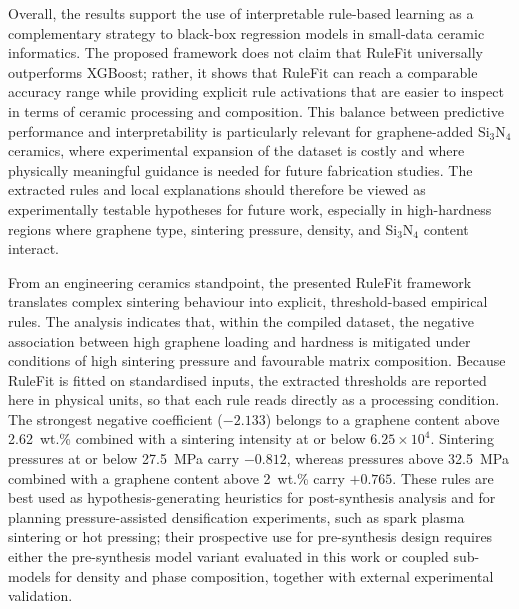 \documentclass[pdflatex,sn-mathphys-num]{sn-jnl}%
\newif\ifrevmarks%
\newcommand{\revmark}[1]{\ifrevmarks\textcolor{revblue}{#1}\else#1\fi}%
\theoremstyle{thmstyleone}%
\theoremstyle{thmstyletwo}%
\theoremstyle{thmstylethree}%
\begin{document}
Overall, the results support the use of interpretable rule-based learning as a complementary strategy to black-box regression models in small-data ceramic informatics. The proposed framework does not claim that RuleFit universally outperforms XGBoost; rather, it shows that RuleFit can reach a comparable accuracy range while providing explicit rule activations that are easier to inspect in terms of ceramic processing and composition. This balance between predictive performance and interpretability is particularly relevant for graphene-added Si$_3$N$_4$ ceramics, where experimental expansion of the dataset is costly and where physically meaningful guidance is needed for future fabrication studies. The extracted rules and local explanations should therefore be viewed as experimentally testable hypotheses for future work, especially in high-hardness regions where graphene type, sintering pressure, density, and Si$_3$N$_4$ content interact.

\revmark{From an engineering ceramics standpoint, the presented RuleFit framework translates complex sintering behaviour into explicit, threshold-based empirical rules. The analysis indicates that, within the compiled dataset, the negative association between high graphene loading and hardness is mitigated under conditions of high sintering pressure and favourable matrix composition. Because RuleFit is fitted on standardised inputs, the extracted thresholds are reported here in physical units, so that each rule reads directly as a processing condition. The strongest negative coefficient ($-2.133$) belongs to a graphene content above 2.62~wt.\% combined with a sintering intensity at or below $6.25\times10^{4}$. Sintering pressures at or below 27.5~MPa carry $-0.812$, whereas pressures above 32.5~MPa combined with a graphene content above 2~wt.\% carry $+0.765$. These rules are best used as hypothesis-generating heuristics for post-synthesis analysis and for planning pressure-assisted densification experiments, such as spark plasma sintering or hot pressing; their prospective use for pre-synthesis design requires either the pre-synthesis model variant evaluated in this work or coupled sub-models for density and phase composition, together with external experimental validation.}
\end{document}
